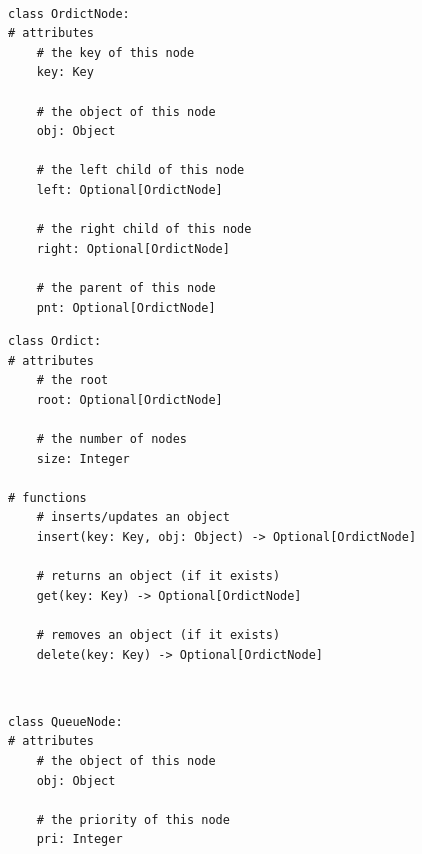 \documentclass[mathserif, handout]{beamer}
\begin{document}
\begin{frame}[fragile]
  \vspace{-10mm}
  \begin{thmboxtop}
     \\
    \begin{lstlisting}[style=mypython]
class OrdictNode:
# attributes
    # the key of this node
    key: Key

    # the object of this node
    obj: Object

    # the left child of this node
    left: Optional[OrdictNode]

    # the right child of this node
    right: Optional[OrdictNode]

    # the parent of this node
    pnt: Optional[OrdictNode]
\end{lstlisting}
  \end{thmboxtop}
\end{frame}

\begin{frame}[fragile]
  \vspace{-5mm}
  \begin{thmboxbot}
    \begin{lstlisting}[style=mypython]
class Ordict:
# attributes
    # the root
    root: Optional[OrdictNode]
    
    # the number of nodes
    size: Integer
    
# functions
    # inserts/updates an object
    insert(key: Key, obj: Object) -> Optional[OrdictNode]

    # returns an object (if it exists)
    get(key: Key) -> Optional[OrdictNode]

    # removes an object (if it exists)
    delete(key: Key) -> Optional[OrdictNode]
\end{lstlisting}
  \end{thmboxbot}
\end{frame}

\begin{frame}[fragile]
  \begin{thmboxtop}
     \\
    \begin{lstlisting}[style=mypython]
class QueueNode:
# attributes
    # the object of this node
    obj: Object

    # the priority of this node
    pri: Integer
\end{lstlisting}
  \end{thmboxtop}
\end{frame}
\end{document}
